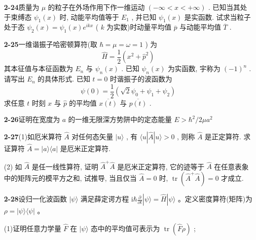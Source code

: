 \vfill

\newpage
\vfill

\noindent
\textbf{2-24}\quad 质量为 $\mu$ 的粒子在外场作用下作一维运动 $(- \infty < x < + \infty)$ . 已知当其处于束缚态 $\psi_{1}(x)$ 时, 动能平均值等于 $E_{1}$ , 并已知 $\psi_{1}(x)$ 是实函数. 试求当粒子处于态 $\psi_{2}(x) = \psi_{1}(x)e^{ikx}$ ( $k$ 为实数)时动量平均值 $\overline{p}$ 与动能平均值 $\overline{T}$ .

\vfill

\newpage
\vfill

\noindent
\textbf{2-25}\quad 一维谐振子哈密顿算符(取 $\hbar = \mu = \omega = 1$ ) 为
\begin{equation}\tag{1}
\hat {H} = \frac {1}{2} (x ^ {2} + \hat {p} ^ {2})
\end{equation}
其本征值与本征函数为 $E_{n}$ 与 $\psi_{n}(x)$ . 已知 $\psi_{n}(x)$ 为实函数, 宇称为 $(-1)^{n}$ . 请写出 $E_{n}$ 的具体形式. 已知 $t = 0$ 时谐振子的波函数为
\begin{equation}\tag{2}
\psi (0) = \frac {1}{2} \left(\sqrt {2} \psi_ {0} + \psi_ {1} + \psi_ {2}\right)
\end{equation}
求任意 $t$ 时刻 $x$ 与 $\hat{p}$ 的平均值 $\overline{x(t)}$ 与 $\overline{p(t)}$ .

\vfill

\newpage
\vfill

\noindent
\textbf{2-26}\quad 证明在宽度为 $a$ 的一维无限深方势阱中的定态能量 $E > \hbar^2 / 2\mu a^2$

\vfill

\newpage
\vfill

\noindent
\textbf{2-27}\quad (1)如厄米算符 $\hat{A}$ 对任何态矢量 $|u\rangle$ , 有 $\langle u|\hat{A}|u\rangle > 0$ , 则称 $\hat{A}$ 是正定算符. 求证算符 $\hat{A} = |a\rangle\langle a|$ 是厄米正定算符. 

(2) 如 $\hat{A}$ 是任一线性算符, 证明 $\hat{A}^{+}\hat{A}$ 是厄米正定算符, 它的迹等于 $\hat{A}$ 在任意表象中的矩阵元的模平方之和, 试推导, 当且仅当 $\hat{A} = 0$ 时, $\operatorname{tr}(\hat{A}^{+}\hat{A}) = 0$ 才成立.

\vfill

\newpage
\vfill

\noindent
\textbf{2-28}\quad 设归一化波函数 $|\psi\rangle$ 满足薛定谔方程 $\mathrm{i}\hbar \frac{\partial}{\partial t} |\psi \rangle = \hat{H} |\psi \rangle$ 。定义密度算符(矩阵)为 $\rho = |\psi\rangle \langle \psi|$ 。

(1)证明任意力学量 $\hat{F}$ 在 $|\psi\rangle$ 态中的平均值可表示为 $\operatorname{tr}(\hat{F}\rho)$ ; 

